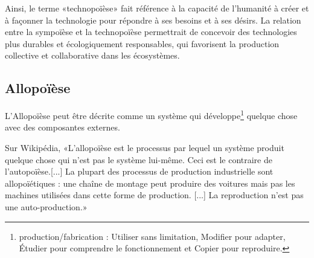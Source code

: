
Ainsi, le terme «technopoïèse» fait référence à la capacité de l'humanité à créer et à façonner la technologie pour répondre à ses besoins et à ses désirs. La relation entre la sympoïèse et la technopoïèse permettrait de concevoir des technologies plus durables et écologiquement responsables, qui favorisent la production collective et collaborative dans les écosystèmes. 

\subsection{Allopoïèse}

L'Allopoïèse peut être décrite comme un système qui développe\footnote{production/fabrication : Utiliser sans limitation, Modifier pour adapter, Étudier pour comprendre le fonctionnement et Copier pour reproduire.} quelque chose avec des composantes externes.

Sur Wikipédia, «L'allopoïèse est le processus par lequel un système produit quelque chose qui n'est pas le système lui-même. Ceci est le contraire de l'autopoïèse.[...] La plupart des processus de production industrielle sont allopoïétiques : une chaîne de montage peut produire des voitures mais pas les machines utilisées dans cette forme de production. [...] La reproduction n'est pas une auto-production.»~\cite{wiki_allopoiesis_2018}~\cite{vuc_allopoiesis_2018}



